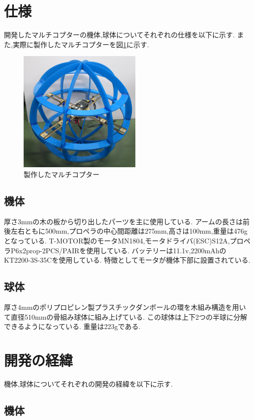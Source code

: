 \documentclass[12pt,oneside]{sotsuken_paper}
\begin{document}
\section{仕様}
開発したマルチコプターの機体,球体についてそれぞれの仕様を以下に示す.
また,実際に製作したマルチコプターを図\ref{fig:multicopter}に示す.

\begin{figure}[htbp]
	\begin{center}
		\includegraphics[width=60mm]{image/multicopter.jpg}
		\caption{製作したマルチコプター}
		\label{fig:multicopter}
	\end{center}
\end{figure}

\subsection{機体}
厚さ3mmの木の板から切り出したパーツを主に使用している.
アームの長さは前後左右ともに500mm,プロペラの中心間距離は275mm,高さは100mm,重量は476gとなっている.
T-MOTOR製のモータMN1804,モータドライバ(ESC)S12A,プロペラP6x2prop-2PCS/PAIRを使用している.
バッテリーは11.1v,2200mAhのKT2200-3S-35Cを使用している.
特徴としてモータが機体下部に設置されている.

\subsection{球体}
厚さ4mmのポリプロピレン製プラスチックダンボールの環を木組み構造を用いて直径510mmの骨組み球体に組み上げている.
この球体は上下2つの半球に分解できるようになっている.
重量は223gである.

\section{開発の経緯}
機体,球体についてそれぞれの開発の経緯を以下に示す.

\subsection{機体}
\end{document}
